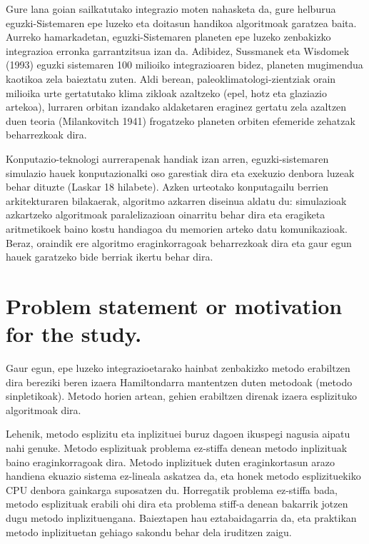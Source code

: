Gure lana goian sailkatutako integrazio moten nahasketa da, gure helburua eguzki-Sistemaren epe luzeko eta doitasun handikoa algoritmoak garatzea baita. Aurreko hamarkadetan, eguzki-Sistemaren planeten epe luzeko zenbakizko integrazioa erronka garrantzitsua izan da. Adibidez, Sussmanek eta Wisdomek (1993) \cite{Sussman1992} eguzki sistemaren 100 milioiko integrazioaren bidez, planeten mugimendua kaotikoa zela baieztatu zuten. Aldi berean, paleoklimatologi-zientziak orain milioika urte gertatutako klima zikloak  azaltzeko (epel, hotz eta glaziazio artekoa), lurraren orbitan izandako aldaketaren eraginez gertatu zela azaltzen duen teoria (Milankovitch 1941) \cite{Berger2012} frogatzeko planeten orbiten efemeride zehatzak beharrezkoak dira.        

Konputazio-teknologi aurrerapenak handiak izan arren, eguzki-sistemaren simulazio hauek konputazionalki oso garestiak dira eta exekuzio denbora luzeak behar dituzte (Laskar  18 hilabete). Azken urteotako konputagailu berrien arkitekturaren bilakaerak, algoritmo azkarren diseinua aldatu du: simulazioak azkartzeko algoritmoak paralelizazioan oinarritu behar dira eta eragiketa aritmetikoek baino kostu handiagoa du memorien arteko datu komunikazioak. Beraz, oraindik ere algoritmo eraginkorragoak beharrezkoak dira eta gaur egun hauek garatzeko bide berriak ikertu behar dira.


\section{Problem statement or motivation for the study.}
\label{intro}

Gaur egun, epe luzeko integrazioetarako hainbat zenbakizko metodo erabiltzen dira bereziki beren izaera Hamiltondarra mantentzen duten metodoak (metodo sinpletikoak). Metodo horien artean, gehien erabiltzen direnak izaera esplizituko algoritmoak dira.

Lehenik, metodo esplizitu eta inplizituei buruz dagoen ikuspegi nagusia aipatu nahi genuke. Metodo esplizituak problema ez-stiffa denean metodo inplizituak baino eraginkorragoak dira. Metodo inplizituek duten eraginkortasun arazo handiena ekuazio sistema ez-lineala askatzea da, eta honek metodo esplizituekiko CPU denbora gainkarga suposatzen du. Horregatik problema ez-stiffa bada, metodo esplizituak erabili ohi dira eta problema stiff-a denean bakarrik jotzen dugu metodo inplizituengana. Baieztapen hau eztabaidagarria da, eta praktikan metodo inplizituetan gehiago sakondu behar dela iruditzen zaigu. 

